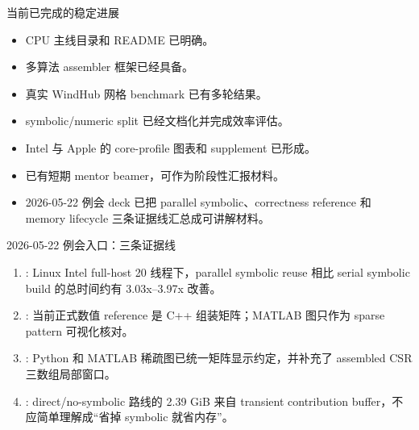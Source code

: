 \begin{frame}{当前已完成的稳定进展}
\begin{itemize}
  \item CPU 主线目录和 README 已明确。
  \item 多算法 assembler 框架已经具备。
  \item 真实 WindHub 网格 benchmark 已有多轮结果。
  \item symbolic/numeric split 已经文档化并完成效率评估。
  \item Intel 与 Apple 的 core-profile 图表和 supplement 已形成。
  \item 已有短期 mentor beamer，可作为阶段性汇报材料。
  \item 2026-05-22 例会 deck 已把 parallel symbolic、correctness reference 和 memory lifecycle 三条证据线汇总成可讲解材料。
\end{itemize}
\end{frame}

\begin{frame}{2026-05-22 例会入口：三条证据线}
\begin{enumerate}
  \item {}: Linux Intel full-host 20 线程下，parallel symbolic reuse 相比 serial symbolic build 的总时间约有 3.03x--3.97x 改善。
  \item {}: 当前正式数值 reference 是 C++  组装矩阵；MATLAB 图只作为 sparse pattern 可视化核对。
  \item {}: Python 和 MATLAB 稀疏图已统一矩阵显示约定，并补充了 assembled CSR 三数组局部窗口。
  \item {}: direct/no-symbolic 路线的 2.39 GiB 来自 transient contribution buffer，不应简单理解成“省掉 symbolic 就省内存”。
\end{enumerate}
\end{frame}

